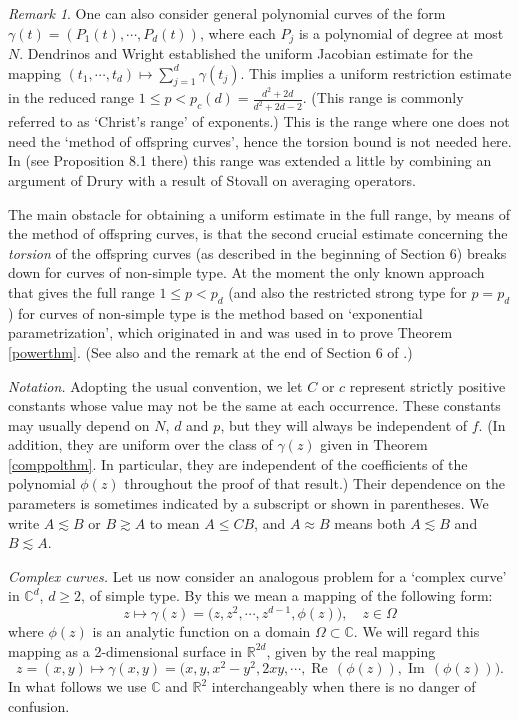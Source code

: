 \documentclass[11 pt]{amsart}
\theoremstyle{plain}
\numberwithin{equation}{section}
\theoremstyle{plain}
\numberwithin{equation}{section}
\theoremstyle{remark}
\newtheorem{remark}[theorem]{Remark}
\begin{document}
\begin{remark}
One can also consider general polynomial curves of the form $\gamma(t) = (P_1(t), \cdots, P_d(t))$, where each $P_j$ is a polynomial of degree at most $N$. Dendrinos and Wright \cite{DeW} established the uniform Jacobian estimate for the mapping $(t_1, \cdots, t_d) \mapsto \sum_{j=1}^d \gamma(t_j)$. This implies a uniform restriction estimate in the reduced range $1\le p < p_c(d) = \frac{d^2+2d}{d^2+2d-2}$. (This range is commonly referred to as `Christ's range' of exponents.) This is the range where one does not need the `method of offspring curves', hence the torsion bound is not needed here. In \cite{BOS3} (see Proposition 8.1 there) this range was extended a little by combining an argument of Drury \cite{D2} with a result of Stovall \cite{Sto} on averaging operators.

The main obstacle for obtaining a uniform estimate in the full range, by means of the method of offspring curves, is that the second crucial estimate concerning the {\it torsion} of the offspring curves (as described in the beginning of Section 6) breaks down for curves of non-simple type. At the moment the only known approach that gives the full range $1\le p<p_d$ (and also the restricted strong type for $p=p_d$) for curves of non-simple type is the method based on `exponential parametrization', which originated in \cite{DM2} and was used in \cite{BOS3} to prove Theorem \ref{powerthm}. (See also \cite{DeM} and the remark at the end of Section 6 of \cite{BOS3}.)
\end{remark}

{\sl Notation.} Adopting the usual convention, we let $C$ or $c$ represent strictly positive constants whose value may not be the same at each occurrence. These constants may usually depend on $N$, $d$ and $p$, but they will always be independent of $f$. (In addition, they are uniform over the class of $\gamma(z)$ given in Theorem \ref{comppolthm}. In particular, they are independent of the coefficients of the polynomial $\phi(z)$ throughout the proof of that result.) Their dependence on the parameters is sometimes indicated by a subscript or shown in parentheses. We write $A {\lesssim} B$ or $B {\gtrsim} A$ to mean $A \le C B$, and $A\approx B$ means both $A{\lesssim} B$ and $B{\lesssim} A$.

\medskip
{\sl Complex curves.}
Let us now consider an analogous problem for a `complex curve' in
${{\mathbb {C}}}^d$, $d\ge 2$, of simple type. By this we mean a mapping of the following form:
\begin{equation} \label{compcurve}
z\mapsto \gamma (z) = \big(z, {z^2},\cdots, {z^{d-1}}
, \phi (z)\big), \quad z\in \Omega
\end{equation}
where  $\phi(z)$ is an analytic function on a domain $\Omega \subset {{\mathbb {C}}}$. We will regard this mapping as a 2-dimensional surface in ${{\mathbb {R}}}^{2d}$, given by the real mapping
\[ z = (x,y)\mapsto \gamma(x,y) = \big( x,y, {x^2-y^2}, 2xy, \cdots, {\operatorname{Re\,}}(\phi(z)), {\operatorname{Im\,}}(\phi(z)) \big)
.\]
In what follows we use ${{\mathbb {C}}}$ and
${{\mathbb {R}}}^2$ interchangeably when there is no danger of confusion.
\end{document}
